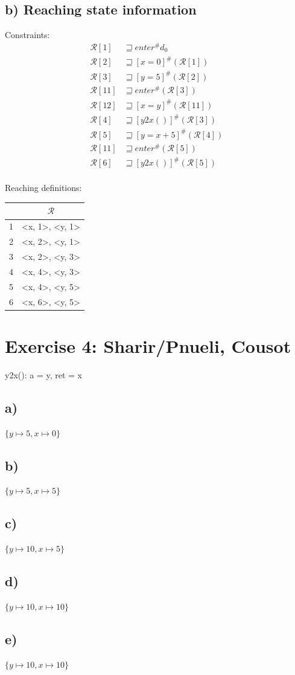 \documentclass[11pt,a4paper]{scrartcl}
\begin{document}
\subsection*{b) Reaching state information}
\begin{minipage}[t]{0.5\textwidth}
Constraints:\\
\begin{align*}
\mathcal{R}[1] &\sqsupseteq enter^\# d_0 \\
\mathcal{R}[2] &\sqsupseteq [x=0]^\# (\mathcal{R}[1]) \\
\mathcal{R}[3] &\sqsupseteq [y=5]^\# (\mathcal{R}[2]) \\
\mathcal{R}[11] &\sqsupseteq enter^\# (\mathcal{R}[3]) \\
\mathcal{R}[12] &\sqsupseteq [x=y]^\# (\mathcal{R}[11]) \\
\mathcal{R}[4] &\sqsupseteq [y2x()]^\# (\mathcal{R}[3]) \\
\mathcal{R}[5] &\sqsupseteq [y=x+5]^\# (\mathcal{R}[4]) \\
\mathcal{R}[11] &\sqsupseteq enter^\# (\mathcal{R}[5]) \\
\mathcal{R}[6] &\sqsupseteq [y2x()]^\# (\mathcal{R}[5]) \\
\end{align*}
\end{minipage}
\begin{minipage}[t]{0.5\textwidth}
Reaching definitions:\\
\begin{tabular}{|c|c|}
\hline
& $\mathcal{R}$ \\
\hline
1 & <x, 1>, <y, 1> \\
2 & <x, 2>, <y, 1> \\
3 & <x, 2>, <y, 3> \\
4 & <x, 4>, <y, 3> \\
5 & <x, 4>, <y, 5> \\
6 & <x, 6>, <y, 5> \\
\hline
\end{tabular}
\end{minipage}

\section*{Exercise 4: Sharir/Pnueli, Cousot}
y2x(): a = y, ret = x
\subsection*{a)}
$\{y \mapsto 5, x \mapsto 0\}$

\subsection*{b)}
$\{y \mapsto 5, x \mapsto 5\}$

\subsection*{c)}
$\{y \mapsto 10, x \mapsto 5\}$

\subsection*{d)}
$\{y \mapsto 10, x \mapsto 10\}$

\subsection*{e)}
$\{y \mapsto 10, x \mapsto 10\}$
\end{document}
